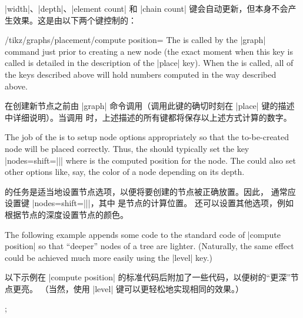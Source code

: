 |width|、|depth|、|element count| 和 |chain count| 键会自动更新，但本身不会产生效果。这是由以下两个键控制的：
\begin{key}{/tikz/graphs/placement/compute position=}
    The  is called by the |graph| command just prior to creating a
    new node (the exact moment when this key is called is detailed in the
    description of the |place| key). When the  is called, all of the
    keys described above will hold numbers computed in the way described above.


     在创建新节点之前由 |graph| 命令调用（调用此键的确切时刻在 |place| 键的描述中详细说明）。当调用  时，上述描述的所有键都将保存以上述方式计算的数字。



    The job of the  is to setup node options appropriately so that
    the to-be-created node will be placed correctly. Thus, the 
    should typically set the key |nodes={shift=||}| where
     is the computed position for the node. The 
    could also set other options like, say, the color of a node depending on
    its depth.

     的任务是适当地设置节点选项，以便将要创建的节点被正确放置。因此， 通常应设置键 |nodes={shift=||}|，其中  是节点的计算位置。 还可以设置其他选项，例如根据节点的深度设置节点的颜色。



    The following example appends some code to the standard code of
    |compute position| so that ``deeper'' nodes of a tree are lighter.
    (Naturally, the same effect could be achieved much more easily using the
    |level| key.)
    
    以下示例在 |compute position| 的标准代码后附加了一些代码，以便树的“更深”节点更亮。 （当然，使用 |level| 键可以更轻松地实现相同的效果。）%
\begin{codeexample}[preamble={\usetikzlibrary{graphs}}]
\newcount\mycount
\def\lightendeepernodes{
  \pgfmathsetcount{\mycount}{
    100-20*\pgfkeysvalueof{/tikz/graphs/placement/width}
  }
  \edef\mydepth{\the\mycount}
  \tikzset{nodes={fill=red!\mydepth,circle,text=white}}
}
\tikz
  \graph [placement/compute position/.append code=\lightendeepernodes]
   {
     a -> {
       b -> c -> d,
       e -> {
         f,
         g
       },
       h
     }
   };
\end{codeexample}
\end{key}

